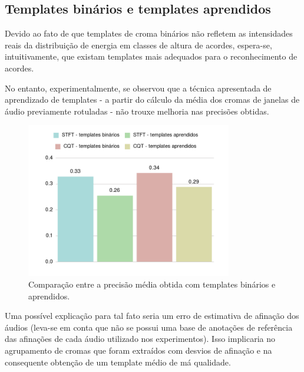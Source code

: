     \subsection{Templates binários e templates aprendidos}
    
        Devido ao fato de que templates de croma binários não refletem as intensidades reais da distribuição de energia em classes de altura de acordes, espera-se, intuitivamente, que existam templates mais adequados para o reconhecimento de acordes.
        
        No entanto, experimentalmente, se observou que a técnica apresentada de aprendizado de templates - a partir do cálculo da média dos cromas de janelas de áudio previamente rotuladas - não trouxe melhoria nas precisões obtidas.

        \begin{figure}[h]
            \begin{center}
                \includegraphics[width=9cm]{figuras/03-stft-e-cqt-templates-bin-e-aprendidos.png}
                \caption{\label{fig:exp:templates_chroma}Comparação entre a precisão média obtida com templates binários e aprendidos.}
            \end{center}
        \end{figure}
        
        Uma possível explicação para tal fato seria um erro de estimativa de afinação dos áudios (leva-se em conta que não se possui uma base de anotações de referência das afinações de cada áudio utilizado nos experimentos). Isso implicaria no agrupamento de cromas que foram extraídos com desvios de afinação e na consequente obtenção de um template médio de má qualidade.
        
